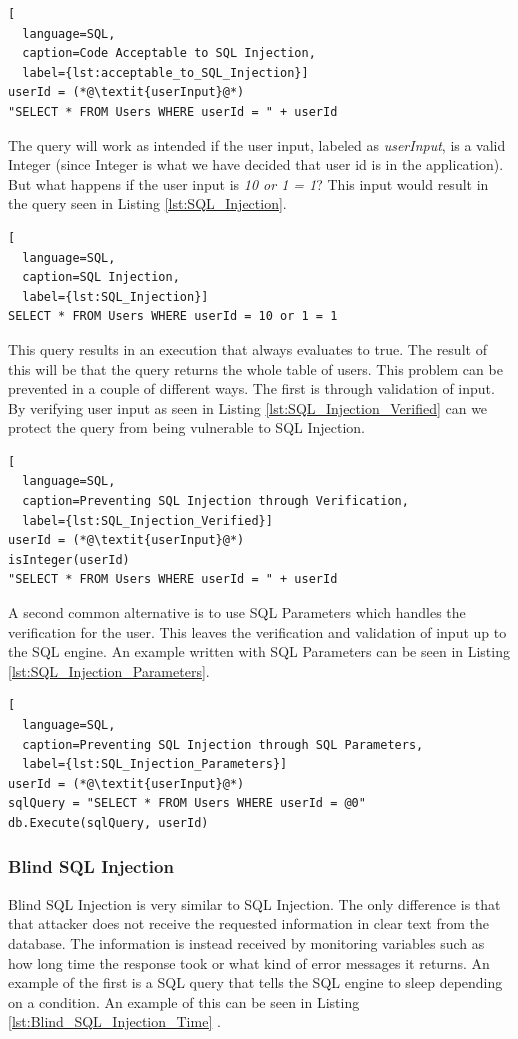 \hfill
\begin{lstlisting}[
  language=SQL,
  caption=Code Acceptable to SQL Injection,
  label={lst:acceptable_to_SQL_Injection}]
userId = (*@\textit{userInput}@*)
"SELECT * FROM Users WHERE userId = " + userId
\end{lstlisting}
\hfill

The query will work as intended if the user input, labeled as \textit{userInput}, is a valid Integer (since Integer is what we have decided that user id is in the application). But what happens if the user input is \textit{10 or 1 = 1}? This input would result in the query seen in Listing \ref{lst:SQL_Injection}.

\hfill
\begin{lstlisting}[
  language=SQL,
  caption=SQL Injection,
  label={lst:SQL_Injection}]
SELECT * FROM Users WHERE userId = 10 or 1 = 1
\end{lstlisting}
\hfill

This query results in an execution that always evaluates to true. The result of this will be that the query returns the whole table of users. This problem can be prevented in a couple of different ways. The first is through validation of input. By verifying user input as seen in Listing \ref{lst:SQL_Injection_Verified} can we protect the query from being vulnerable to SQL Injection.

\hfill
\begin{lstlisting}[
  language=SQL,
  caption=Preventing SQL Injection through Verification,
  label={lst:SQL_Injection_Verified}]
userId = (*@\textit{userInput}@*)
isInteger(userId)
"SELECT * FROM Users WHERE userId = " + userId
\end{lstlisting}
\hfill

A second common alternative is to use SQL Parameters which handles the verification for the user. This leaves the verification and validation of input up to the SQL engine. An example written with SQL Parameters can be seen in Listing \ref{lst:SQL_Injection_Parameters}.

\hfill
\begin{lstlisting}[
  language=SQL,
  caption=Preventing SQL Injection through SQL Parameters,
  label={lst:SQL_Injection_Parameters}]
userId = (*@\textit{userInput}@*)
sqlQuery = "SELECT * FROM Users WHERE userId = @0"
db.Execute(sqlQuery, userId)
\end{lstlisting}



\subsubsection{Blind SQL Injection}
Blind SQL Injection is very similar to SQL Injection. The only difference is that that attacker does not receive the requested information in clear text from the database. The information is instead received by monitoring variables such as how long time the response took or what kind of error messages it returns. An example of the first is a SQL query that tells the SQL engine to sleep depending on a condition. An example of this can be seen in Listing \ref{lst:Blind_SQL_Injection_Time} \parencite{JustinClarke-Salt2009SIAa, Secure_Web}.


